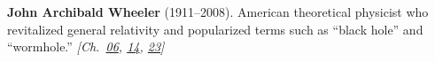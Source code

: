 \textbf{John Archibald Wheeler} (1911–2008). American theoretical physicist who revitalized general relativity and popularized terms such as ``black hole'' and ``wormhole.'' \emph{[Ch.~\hyperref[ch:gravitytimedilation]{06}, \hyperref[ch:compacttwinparadox]{14}, \hyperref[ch:blackholetimedilationredshift]{23}]}

